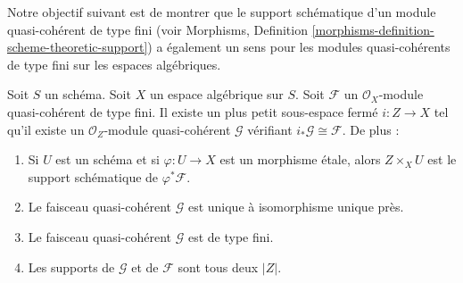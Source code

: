\noindent
Notre objectif suivant est de montrer que le support schématique
d'un module quasi-cohérent de type fini (voir
Morphisms, Definition \ref{morphisms-definition-scheme-theoretic-support})
a également un sens pour les modules quasi-cohérents de type fini sur les
espaces algébriques.

\begin{lemma}
\label{lemma-scheme-theoretic-support}
Soit $S$ un schéma. Soit $X$ un espace algébrique sur $S$.
Soit $\mathcal{F}$ un $\mathcal{O}_X$-module quasi-cohérent de type fini.
Il existe un plus petit sous-espace fermé $i : Z \to X$ tel qu'il
existe un $\mathcal{O}_Z$-module quasi-cohérent $\mathcal{G}$ vérifiant
$i_*\mathcal{G} \cong \mathcal{F}$. De plus :
\begin{enumerate}
\item Si $U$ est un schéma et si $\varphi : U \to X$ est un morphisme étale,
alors $Z \times_X U$ est le support schématique de $\varphi^*\mathcal{F}$.
\item Le faisceau quasi-cohérent $\mathcal{G}$ est unique à isomorphisme
unique près.
\item Le faisceau quasi-cohérent $\mathcal{G}$ est de type fini.
\item Les supports de $\mathcal{G}$ et de $\mathcal{F}$ sont tous deux $|Z|$.
\end{enumerate}
\end{lemma}

